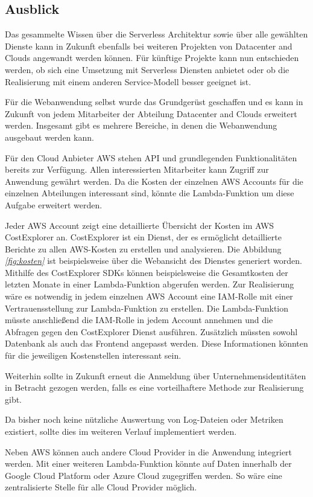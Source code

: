 \subsection{Ausblick}
Das gesammelte Wissen über die Serverless Architektur sowie über alle gewählten Dienste kann in Zukunft ebenfalls bei weiteren Projekten von Datacenter and Clouds angewandt werden können.
Für künftige Projekte kann nun entschieden werden, ob sich eine Umsetzung mit Serverless Diensten anbietet oder ob die Realisierung mit einem anderen Service-Modell besser geeignet ist.

Für die Webanwendung selbst wurde das Grundgerüst geschaffen und es kann in Zukunft von jedem Mitarbeiter der Abteilung Datacenter and Clouds erweitert werden.
Insgesamt gibt es mehrere Bereiche, in denen die Webanwendung ausgebaut werden kann.

Für den Cloud Anbieter AWS stehen API und grundlegenden Funktionalitäten bereits zur Verfügung.
Allen interessierten Mitarbeiter kann Zugriff zur Anwendung gewährt werden.
Da die Kosten der einzelnen AWS Accounts für die einzelnen Abteilungen interessant sind, könnte die Lambda-Funktion um diese Aufgabe erweitert werden.

Jeder AWS Account zeigt eine detaillierte Übersicht der Kosten im AWS CostExplorer an.
CostExplorer ist ein Dienst, der es ermöglicht detaillierte Berichte zu allen AWS-Kosten zu erstellen und analysieren.
Die Abbildung \textit{\ref{fig:kosten} } ist beispielsweise über die Webansicht des Dienstes generiert worden.
Mithilfe des CostExplorer SDKs können beispielsweise die Gesamtkosten der letzten Monate in einer Lambda-Funktion abgerufen werden.
Zur Realisierung wäre es notwendig in jedem einzelnen AWS Account eine IAM-Rolle mit einer Vertrauensstellung zur Lambda-Funktion zu erstellen.
Die Lambda-Funktion müsste anschließend die IAM-Rolle in jedem Account annehmen und die Abfragen gegen den CostExplorer Dienst ausführen.
Zusätzlich müssten sowohl Datenbank als auch das Frontend angepasst werden.
Diese Informationen könnten für die jeweiligen Kostenstellen interessant sein.

Weiterhin sollte in Zukunft erneut die Anmeldung über Unternehmensidentitäten in Betracht gezogen werden, falls es eine vorteilhaftere Methode zur Realisierung gibt.

Da bisher noch keine nützliche Auswertung von Log-Dateien oder Metriken existiert, sollte dies im weiteren Verlauf implementiert werden.

Neben AWS können auch andere Cloud Provider in die Anwendung integriert werden.
Mit einer weiteren Lambda-Funktion könnte auf Daten innerhalb der Google Cloud Platform oder Azure Cloud zugegriffen werden.
So wäre eine zentralisierte Stelle für alle Cloud Provider möglich.















